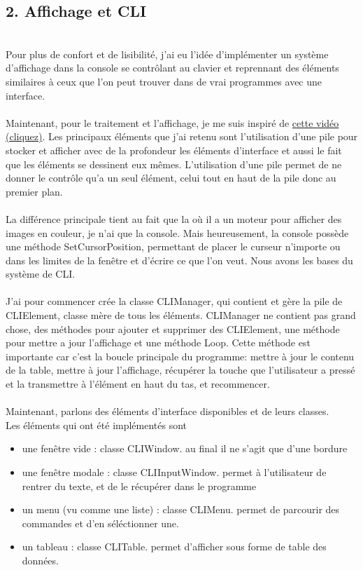 \documentclass[11pt]{article}
\begin{document}
    \subsection*{2. Affichage et CLI}
    \\
    Pour plus de confort et de lisibilité, j'ai eu l'idée d'implémenter un système d'affichage dans la console se contrôlant au clavier et reprennant des éléments similaires à ceux que l'on peut trouver dans de vrai programmes avec une interface. 
    \\\\
    Maintenant, pour le traitement et l'affichage, je me suis inspiré de \href{https://www.youtube.com/watch?v=jde1Jq5dF0E}{ cette vidéo (cliquez)}. Les principaux éléments que j'ai retenu sont l'utilisation d'une pile pour stocker et afficher avec de la profondeur les éléments d'interface et aussi le fait que les éléments se dessinent eux mêmes. L'utilisation d'une pile permet de ne donner le contrôle qu'a un seul élément, celui tout en haut de la pile donc au premier plan. 
    \\\\
    La différence principale tient au fait que la où il a un moteur pour afficher des images en couleur, je n'ai que la console. Mais heureusement, la console possède une méthode SetCursorPosition, permettant de placer le curseur n'importe ou dans les limites de la fenêtre et d'écrire ce que l'on veut. Nous avons les bases du système de CLI.
    \\\\
    J'ai pour commencer crée la classe CLIManager, qui contient et gère la pile de CLIElement, classe mère de tous les éléments. CLIManager ne contient pas grand chose, des méthodes pour ajouter et supprimer des CLIElement, une méthode pour mettre a jour l'affichage et une méthode Loop. Cette méthode est importante car c'est la boucle principale du programme: mettre à jour le contenu de la table, mettre à jour l'affichage, récupérer la touche que l'utilisateur a pressé et la transmettre à l'élément en haut du tas, et recommencer.
    \\\\
    Maintenant, parlons des éléments d'interface disponibles et de leurs classes.
    \\
    Les éléments qui ont été implémentés sont
    \begin{itemize}
        \item une fenêtre vide : classe CLIWindow. au final il ne s'agit que d'une bordure
        \item une fenêtre modale : classe CLIInputWindow. permet à l'utilisateur de rentrer du texte, et de le récupérer dans le programme
        \item un menu (vu comme une liste) : classe CLIMenu. permet de parcourir des commandes et d'en séléctionner une.
        \item un tableau : classe CLITable. permet d'afficher sous forme de table des données. 
    \end{itemize}
\end{document}

